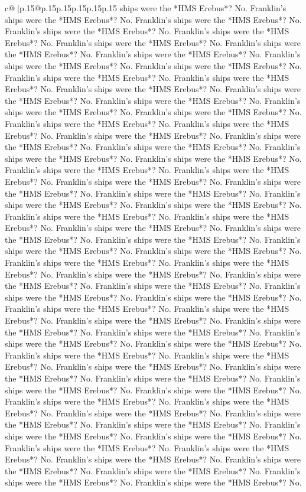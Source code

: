 \documentclass{article}
\begin{document}
{\begin{supertabular}{c@{$\;$}|p{.15\linewidth}@{}p{.15\linewidth}p{.15\linewidth}p{.15\linewidth}p{.15\linewidth}p{.15\linewidth}}
{{{ships were the *HMS Erebus*? No. Franklin's ships were the *HMS Erebus*? No. Franklin's ships were the *HMS Erebus*? No. Franklin's ships were the *HMS Erebus*? No. Franklin's ships were the *HMS Erebus*? No. Franklin's ships were the *HMS Erebus*? No. Franklin's ships were the *HMS Erebus*? No. Franklin's ships were the *HMS Erebus*? No. Franklin's ships were the *HMS Erebus*? No. Franklin's ships were the *HMS Erebus*? No. Franklin's ships were the *HMS Erebus*? No. Franklin's ships were the *HMS Erebus*? No. Franklin's ships were the *HMS Erebus*? No. Franklin's ships were the *HMS Erebus*? No. Franklin's ships were the *HMS Erebus*? No. Franklin's ships were the *HMS Erebus*? No. Franklin's ships were the *HMS Erebus*? No. Franklin's ships were the *HMS Erebus*? No. Franklin's ships were the *HMS Erebus*? No. Franklin's ships were the *HMS Erebus*? No. Franklin's ships were the *HMS Erebus*? No. Franklin's ships were the *HMS Erebus*? No. Franklin's ships were the *HMS Erebus*? No. Franklin's ships were the *HMS Erebus*? No. Franklin's ships were the *HMS Erebus*? No. Franklin's ships were the *HMS Erebus*? No. Franklin's ships were the *HMS Erebus*? No. Franklin's ships were the *HMS Erebus*? No. Franklin's ships were the *HMS Erebus*? No. Franklin's ships were the *HMS Erebus*? No. Franklin's ships were the *HMS Erebus*? No. Franklin's ships were the *HMS Erebus*? No. Franklin's ships were the *HMS Erebus*? No. Franklin's ships were the *HMS Erebus*? No. Franklin's ships were the *HMS Erebus*? No. Franklin's ships were the *HMS Erebus*? No. Franklin's ships were the *HMS Erebus*? No. Franklin's ships were the *HMS Erebus*? No. Franklin's ships were the *HMS Erebus*? No. Franklin's ships were the *HMS Erebus*? No. Franklin's ships were the *HMS Erebus*? No. Franklin's ships were the *HMS Erebus*? No. Franklin's ships were the *HMS Erebus*? No. Franklin's ships were the *HMS Erebus*? No. Franklin's ships were the *HMS Erebus*? No. Franklin's ships were the *HMS Erebus*? No. Franklin's ships were the *HMS Erebus*? No. Franklin's ships were the *HMS Erebus*? No. Franklin's ships were the *HMS Erebus*? No. Franklin's ships were the *HMS Erebus*? No. Franklin's ships were the *HMS Erebus*? No. Franklin's ships were the *HMS Erebus*? No. Franklin's ships were the *HMS Erebus*? No. Franklin's ships were the *HMS Erebus*? No. Franklin's ships were the *HMS Erebus*? No. Franklin's ships were the *HMS Erebus*? No. Franklin's ships were the *HMS Erebus*? No. Franklin's ships were the *HMS Erebus*? No. Franklin's ships were the *HMS Erebus*? No. Franklin's ships were the *HMS Erebus*? No. Franklin's ships were the *HMS Erebus*? No. Franklin's ships were the *HMS Erebus*? No. Franklin's ships were the *HMS Erebus*? No. Franklin's ships were the *HMS Erebus*? No. Franklin's ships were the *HMS Erebus*? No. Franklin's ships were the *HMS Erebus*? No. Franklin's ships were the *HMS Erebus*? No. Franklin's ships were the *HMS Erebus*? No. Franklin's ships were the *HMS Erebus*? No. Franklin's ships were the *HMS Erebus*? No. Franklin's ships were the *HMS Erebus*? No. Franklin's ships were the *HMS Erebus*? No. Franklin's ships were the *HMS Erebus*? No. }}}
\end{supertabular}}
\end{document}
